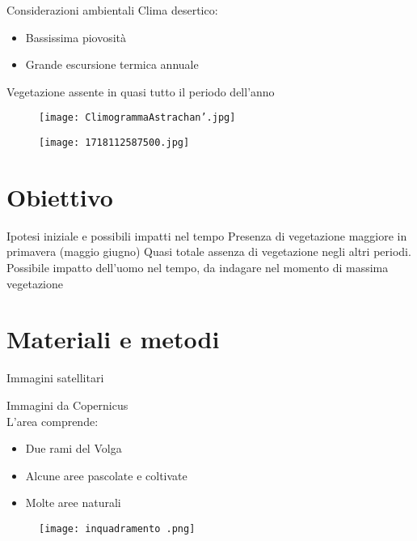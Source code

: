 \documentclass{beamer} %
\begin{document}
\begin{frame}{Considerazioni ambientali} %
Clima desertico: 
	\begin{itemize}
        	\item Bassissima piovosità
        	\item Grande escursione termica annuale 
	\end{itemize}
Vegetazione assente in quasi tutto il periodo dell'anno 

\begin{multicols}{2}
	\begin{figure}
		\centering
		\texttt{[image: ClimogrammaAstrachan'.jpg]}
		\label{fig:enter-label}
	\end{figure}
\columnbreak
	\begin{figure}
		\centering
		\texttt{[image: 1718112587500.jpg]}
		\label{fig:enter-label}
	\end{figure}
\end{multicols}
\end{frame}


\section{Obiettivo}


\begin{frame}{Ipotesi iniziale e possibili impatti nel tempo}
Presenza di vegetazione maggiore in primavera (maggio giugno)
Quasi totale assenza di vegetazione negli altri periodi. \\
\bigskip 
Possibile impatto dell'uomo nel tempo, da indagare nel momento di massima vegetazione
\end{frame}


\section{Materiali e metodi}


\begin{frame}{Immagini satellitari}
\begin{multicols}{2}
Immagini da Copernicus\\
L'area comprende: 
	\begin{itemize}
		\item Due rami del Volga 
		\item Alcune aree pascolate e coltivate 
		\item Molte aree naturali
	\end{itemize}
\columnbreak
	\begin{figure}
		\centering
		\texttt{[image: inquadramento .png]}
  		\label{fig:enter-label}
	\end{figure}
\end{multicols}
\end{frame}
\end{document}
